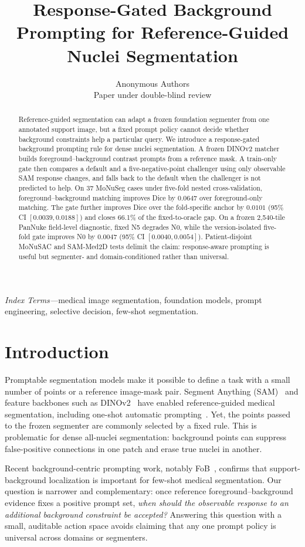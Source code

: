 \documentclass[10pt,twocolumn]{article}
\title{Response-Gated Background Prompting for Reference-Guided Nuclei Segmentation}
\author{Anonymous Authors\\Paper under double-blind review}
\date{}
\begin{document}
\maketitle

\begin{abstract}
Reference-guided segmentation can adapt a frozen foundation segmenter from one annotated support image, but a fixed prompt policy cannot decide whether background constraints help a particular query. We introduce a response-gated background prompting rule for dense nuclei segmentation. A frozen DINOv2 matcher builds foreground--background contrast prompts from a reference mask. A train-only gate then compares a default and a five-negative-point challenger using only observable SAM response changes, and falls back to the default when the challenger is not predicted to help. On 37 MoNuSeg cases under five-fold nested cross-validation, foreground--background matching improves Dice by $0.0647$ over foreground-only matching. The gate further improves Dice over the fold-specific anchor by $0.0101$ (95\% CI $[0.0039,0.0188]$) and closes 66.1\% of the fixed-to-oracle gap. On a frozen 2,540-tile PanNuke field-level diagnostic, fixed N5 degrades N0, while the version-isolated five-fold gate improves N0 by $0.0047$ (95\% CI $[0.0040,0.0054]$). Patient-disjoint MoNuSAC and SAM-Med2D tests delimit the claim: response-aware prompting is useful but segmenter- and domain-conditioned rather than universal.
\end{abstract}

\noindent\textit{Index Terms---}medical image segmentation, foundation models, prompt engineering, selective decision, few-shot segmentation.

\section{Introduction}
Promptable segmentation models make it possible to define a task with a small number of points or a reference image-mask pair. Segment Anything (SAM)~\cite{kirillov2023sam} and feature backbones such as DINOv2~\cite{oquab2024dinov2} have enabled reference-guided medical segmentation, including one-shot automatic prompting~\cite{liu2025sat}. Yet, the points passed to the frozen segmenter are commonly selected by a fixed rule. This is problematic for dense all-nuclei segmentation: background points can suppress false-positive connections in one patch and erase true nuclei in another.

Recent background-centric prompting work, notably FoB~\cite{bo2026fob}, confirms that support-background localization is important for few-shot medical segmentation. Our question is narrower and complementary: once reference foreground--background evidence fixes a positive prompt set, \emph{when should the observable response to an additional background constraint be accepted?} Answering this question with a small, auditable action space avoids claiming that any one prompt policy is universal across domains or segmenters.
\end{document}
